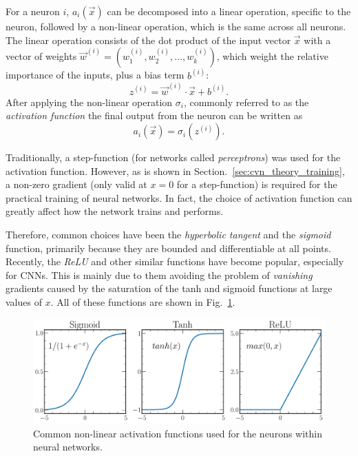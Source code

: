 For a neuron $i$, $a_{i}(\vec{x})$ can be decomposed into a linear operation, specific to the
neuron, followed by a non-linear operation, which is the same across all neurons. The linear
operation consists of the dot product of the input vector $\vec{x}$ with a vector of weights
$\vec{w}^{(i)} = (w_{1}^{(i)}, w_{2}^{(i)},\dots,w_{k}^{(i)})$, which weight the relative
importance of the inputs, plus a bias term $b^{(i)}$:
\begin{equation} %
    z^{(i)}=\vec{w}^{(i)}\cdot\vec{x}+b^{(i)}.
    \label{eq:network}
\end{equation}
After applying the non-linear operation $\sigma_{i}$, commonly referred to as the \emph{activation
    function} the final output from the neuron can be written as
\begin{equation} %
    a_{i}(\vec{x})=\sigma_{i}(z^{(i)}).
    \label{eq:activation}
\end{equation}

Traditionally, a step-function (for networks called \emph{perceptrons}) was used for the
activation function. However, as is shown in Section.~\ref{sec:cvn_theory_training}, a non-zero
gradient (only valid at $x=0$ for a step-function) is required for the practical training of
neural networks. In fact, the choice of activation function can greatly affect how the network
trains and performs.

Therefore, common choices have been the \emph{hyperbolic tangent} and the \emph{sigmoid} function,
primarily because they are bounded and differentiable at all points. Recently, the \emph{ReLU} and
other similar functions have become popular, especially for CNNs. This is mainly due to them
avoiding the problem of \emph{vanishing} gradients caused by the saturation of the tanh and
sigmoid functions at large values of $x$. All of these functions are shown in
Fig.~\ref{fig:activations}.

\begin{figure} %
    \includegraphics[width=\textwidth]{diagrams/6-cvn/activations.pdf}
    \caption[Common non-linear activation functions.]
    {Common non-linear activation functions used for the neurons within neural networks.}
    \label{fig:activations}
\end{figure}

